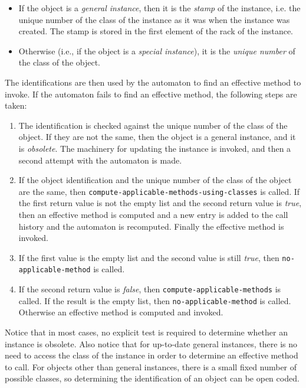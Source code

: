 \begin{itemize}
\item If the object is a \emph{general instance}, then it is the
  \emph{stamp} of the instance, i.e. the unique number of the class of
  the instance as it was when the instance was created.  The stamp is
  stored in the first element of the rack of the instance.
\item Otherwise (i.e., if the object is a \emph{special instance}), it
  is the \emph{unique number} of the class of the object.
\end{itemize}

The identifications are then used by the automaton to find an
effective method to invoke.  If the automaton fails to find an
effective method, the following steps are taken:

\begin{enumerate}
\item The identification is checked against the unique
  number of the class of the object.  If they are not the same, then
  the object is a general instance, and it is \emph{obsolete}.  The
  machinery for updating the instance is invoked, and then a second
  attempt with the automaton is made. 
\item If the object identification and the unique number of the
  class of the object are the same, then
  \texttt{compute-applicable-methods-using-classes} is called.  If the
  first return value is not the empty list and the second return value
  is \textit{true}, then an effective method is computed and a new
  entry is added to the call history and the automaton is recomputed.
  Finally the effective method is invoked.
\item If the first value is the empty list and the second value is
  still \textit{true}, then \texttt{no-applicable-method} is called.
\item If the second return value is \textit{false}, then 
 \texttt{compute-applicable-methods} is called.  If the result is the
 empty list, then \texttt{no-applicable-method} is called.  Otherwise
 an effective method is computed and invoked. 
\end{enumerate}


Notice that in most cases, no explicit test is required to determine
whether an instance is obsolete.  Also notice that for up-to-date
general instances, there is no need to access the class of the
instance in order to determine an effective method to call.  For
objects other than general instances, there is a small fixed number of
possible classes, so determining the identification of an object can
be open coded.

